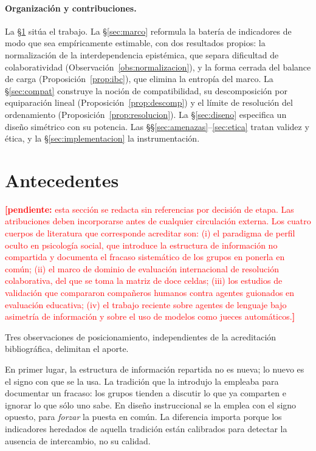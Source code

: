 \documentclass[11pt,a4paper]{article}
\theoremstyle{definition}
\theoremstyle{plain}
\theoremstyle{remark}
\newcommand{\pendiente}[1]{\textcolor{red}{\textbf{[pendiente:} #1\textbf{]}}}
\begin{document}
\paragraph{Organización y contribuciones.}
La §\ref{sec:antecedentes} sitúa el trabajo. La §\ref{sec:marco} reformula la
batería de indicadores de modo que sea empíricamente estimable, con dos resultados
propios: la normalización de la interdependencia epistémica, que separa
dificultad de colaboratividad (Observación~\ref{obs:normalizacion}), y la forma
cerrada del balance de carga (Proposición~\ref{prop:ibc}), que elimina la entropía
del marco. La §\ref{sec:compat} construye la noción de compatibilidad, su
descomposición por equiparación lineal (Proposición~\ref{prop:descomp}) y el
límite de resolución del ordenamiento (Proposición~\ref{prop:resolucion}). La
§\ref{sec:diseno} especifica un diseño simétrico con su potencia. Las
§§\ref{sec:amenazas}--\ref{sec:etica} tratan validez y ética, y la
§\ref{sec:implementacion} la instrumentación.

\section{Antecedentes}\label{sec:antecedentes}

\pendiente{esta sección se redacta sin referencias por decisión de etapa. Las
atribuciones deben incorporarse antes de cualquier circulación externa. Los cuatro
cuerpos de literatura que corresponde acreditar son: (i) el paradigma de perfil
oculto en psicología social, que introduce la estructura de información no
compartida y documenta el fracaso sistemático de los grupos en ponerla en común;
(ii) el marco de dominio de evaluación internacional de resolución colaborativa,
del que se toma la matriz de doce celdas; (iii) los estudios de validación que
compararon compañeros humanos contra agentes guionados en evaluación educativa;
(iv) el trabajo reciente sobre agentes de lenguaje bajo asimetría de información y
sobre el uso de modelos como jueces automáticos.}

Tres observaciones de posicionamiento, independientes de la acreditación
bibliográfica, delimitan el aporte.

En primer lugar, la estructura de información repartida no es nueva; lo nuevo es
el signo con que se la usa. La tradición que la introdujo la empleaba para
documentar un fracaso: los grupos tienden a discutir lo que ya comparten e ignorar
lo que sólo uno sabe. En diseño instruccional se la emplea con el signo opuesto,
para \emph{forzar} la puesta en común. La diferencia importa porque los
indicadores heredados de aquella tradición están calibrados para detectar la
ausencia de intercambio, no su calidad.
\end{document}
